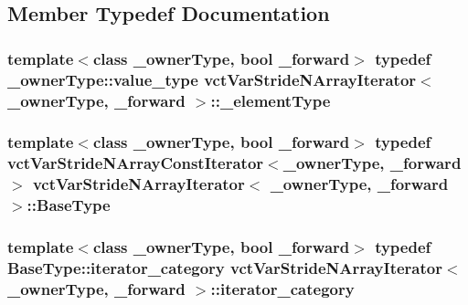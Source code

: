\subsection{Member Typedef Documentation}
\hypertarget{classvct_var_stride_n_array_iterator_ad3f815ae11188c45c85071e5cbd7ee8d}{
\subsubsection[{\-\_\-element\-Type}]{\setlength{\rightskip}{0pt plus 5cm}template$<$class \-\_\-owner\-Type, bool \-\_\-forward$>$ typedef \-\_\-owner\-Type\-::value\-\_\-type {\bf vct\-Var\-Stride\-N\-Array\-Iterator}$<$ \-\_\-owner\-Type, \-\_\-forward $>$\-::{\bf \-\_\-element\-Type}}}\label{classvct_var_stride_n_array_iterator_ad3f815ae11188c45c85071e5cbd7ee8d}
\hypertarget{classvct_var_stride_n_array_iterator_a23f53d3764feb53f61a458e5f28a78ad}{
\subsubsection[{Base\-Type}]{\setlength{\rightskip}{0pt plus 5cm}template$<$class \-\_\-owner\-Type, bool \-\_\-forward$>$ typedef {\bf vct\-Var\-Stride\-N\-Array\-Const\-Iterator}$<$\-\_\-owner\-Type, \-\_\-forward$>$ {\bf vct\-Var\-Stride\-N\-Array\-Iterator}$<$ \-\_\-owner\-Type, \-\_\-forward $>$\-::{\bf Base\-Type}}}\label{classvct_var_stride_n_array_iterator_a23f53d3764feb53f61a458e5f28a78ad}
\hypertarget{classvct_var_stride_n_array_iterator_a914738ffb87fa950256c5fc39d4cf855}{
\subsubsection[{iterator\-\_\-category}]{\setlength{\rightskip}{0pt plus 5cm}template$<$class \-\_\-owner\-Type, bool \-\_\-forward$>$ typedef Base\-Type\-::iterator\-\_\-category {\bf vct\-Var\-Stride\-N\-Array\-Iterator}$<$ \-\_\-owner\-Type, \-\_\-forward $>$\-::{\bf iterator\-\_\-category}}}\label{classvct_var_stride_n_array_iterator_a914738ffb87fa950256c5fc39d4cf855}
